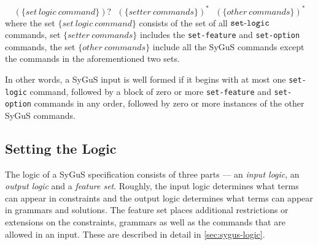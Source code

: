 \documentclass[english,a4paper,10pt]{article}
\begin{document}
\vspace*{2mm}
\noindent
\begin{equation*}
(\mathit{\{ set\ logic\ command \}})?\mbox{ }\mathit{(\{setter\ commands\})^*\mbox{ }(\{other\ commands\})^*}
\end{equation*}
where the set $\mathit{\{set\ logic\ command\}}$ consists
of the set of all ${\tt set\mbox{-}logic}$ commands,
set $\mathit{\{setter\ commands\}}$ includes
the \texttt{set-feature} and \texttt{set-option}
commands, the set $\mathit{\{other\ commands\}}$ include all the SyGuS
commands except the commands in the aforementioned two sets.

In other words, a SyGuS input is well formed if it begins with 
at most one \texttt{set-logic} command, followed by 
a block of zero or more \texttt{set-feature}
and \texttt{set-option} commands in any order, 
followed by zero or more instances of the other SyGuS commands.

\subsection{Setting the Logic}
\label{ssec:set-logic}
The logic of a SyGuS specification consists of three parts ---
an \emph{input logic}, an \emph{output logic} and a \emph{feature set}.
Roughly, 
the input logic determines what terms
can appear in constraints and
the output logic determines
what terms can appear in grammars and solutions.
The feature set places additional restrictions or extensions 
on the constraints, grammars as well as the commands that are allowed in an input.
These are described in detail in \cref{sec:sygus-logic}.
\end{document}
